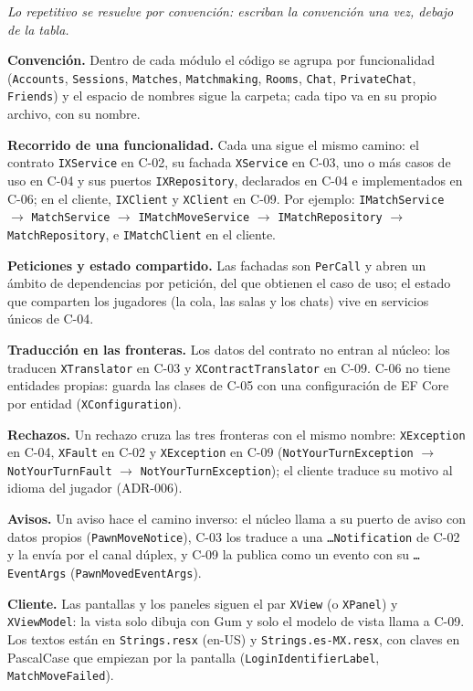 \documentclass[11pt,letterpaper]{article}
\newcommand{\hint}[1]{{\itshape\color{black!70}#1}\par} %
\begin{document}
\hint{Lo repetitivo se resuelve por convención: escriban la convención una vez, debajo de la tabla.}
\begingroup\setlength{\emergencystretch}{2em}
\textbf{Convención.} Dentro de cada módulo el código se agrupa por funcionalidad (\texttt{Accounts}, \texttt{Sessions}, \texttt{Matches}, \texttt{Matchmaking}, \texttt{Rooms}, \texttt{Chat}, \texttt{PrivateChat}, \texttt{Friends}) y el espacio de nombres sigue la carpeta; cada tipo va en su propio archivo, con su nombre.\par
\textbf{Recorrido de una funcionalidad.} Cada una sigue el mismo camino: el contrato \texttt{IXService} en C-02, su fachada \texttt{XService} en C-03, uno o más casos de uso en C-04 y sus puertos \texttt{IXRepository}, declarados en C-04 e implementados en C-06; en el cliente, \texttt{IXClient} y \texttt{XClient} en C-09. Por ejemplo: \texttt{IMatchService} $\rightarrow$ \texttt{MatchService} $\rightarrow$ \texttt{IMatchMoveService} $\rightarrow$ \texttt{IMatchRepository} $\rightarrow$ \texttt{MatchRepository}, e \texttt{IMatchClient} en el cliente.\par
\textbf{Peticiones y estado compartido.} Las fachadas son \texttt{PerCall} y abren un ámbito de dependencias por petición, del que obtienen el caso de uso; el estado que comparten los jugadores (la cola, las salas y los chats) vive en servicios únicos de C-04.\par
\textbf{Traducción en las fronteras.} Los datos del contrato no entran al núcleo: los traducen \texttt{XTranslator} en C-03 y \texttt{XContractTranslator} en C-09. C-06 no tiene entidades propias: guarda las clases de C-05 con una configuración de EF Core por entidad (\texttt{XConfiguration}).\par
\textbf{Rechazos.} Un rechazo cruza las tres fronteras con el mismo nombre: \texttt{XException} en C-04, \texttt{XFault} en C-02 y \texttt{XException} en C-09 (\texttt{NotYourTurnException} $\rightarrow$ \texttt{NotYourTurnFault} $\rightarrow$ \texttt{NotYourTurnException}); el cliente traduce su motivo al idioma del jugador (ADR-006).\par
\textbf{Avisos.} Un aviso hace el camino inverso: el núcleo llama a su puerto de aviso con datos propios (\texttt{PawnMoveNotice}), C-03 los traduce a una \texttt{…Notification} de C-02 y la envía por el canal dúplex, y C-09 la publica como un evento con su \texttt{…EventArgs} (\texttt{PawnMovedEventArgs}).\par
\textbf{Cliente.} Las pantallas y los paneles siguen el par \texttt{XView} (o \texttt{XPanel}) y \texttt{XViewModel}: la vista solo dibuja con Gum y solo el modelo de vista llama a C-09. Los textos están en \texttt{Strings.resx} (en-US) y \texttt{Strings.es-MX.resx}, con claves en PascalCase que empiezan por la pantalla (\texttt{LoginIdentifierLabel}, \texttt{MatchMoveFailed}).\par
\endgroup
\end{document}
